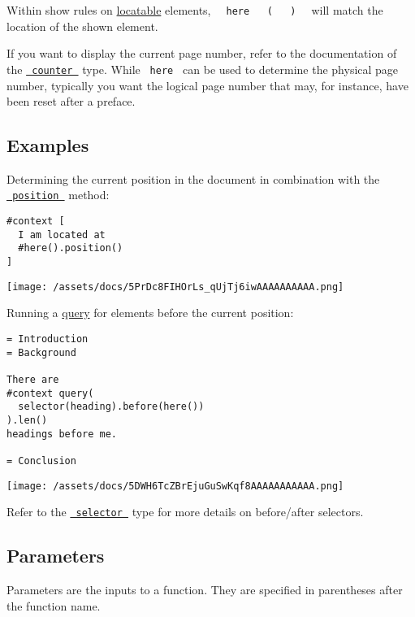 Within show rules on
\href{/docs/reference/introspection/location/\#locatable}{locatable}
elements,
\texttt{\ }{\texttt{\ here\ }}\texttt{\ }{\texttt{\ (\ }}\texttt{\ }{\texttt{\ )\ }}\texttt{\ }
will match the location of the shown element.

If you want to display the current page number, refer to the
documentation of the
\href{/docs/reference/introspection/counter/}{\texttt{\ counter\ }}
type. While \texttt{\ here\ } can be used to determine the physical page
number, typically you want the logical page number that may, for
instance, have been reset after a preface.

\subsection{Examples}\label{examples}

Determining the current position in the document in combination with the
\href{/docs/reference/introspection/location/\#definitions-position}{\texttt{\ position\ }}
method:

\begin{verbatim}
#context [
  I am located at
  #here().position()
]
\end{verbatim}

\texttt{[image: /assets/docs/5PrDc8FIHOrLs\_qUjTj6iwAAAAAAAAAA.png]}

Running a \href{/docs/reference/introspection/query/}{query} for
elements before the current position:

\begin{verbatim}
= Introduction
= Background

There are
#context query(
  selector(heading).before(here())
).len()
headings before me.

= Conclusion
\end{verbatim}

\texttt{[image: /assets/docs/5DWH6TcZBrEjuGuSwKqf8AAAAAAAAAAA.png]}

Refer to the
\href{/docs/reference/foundations/selector/}{\texttt{\ selector\ }} type
for more details on before/after selectors.

\subsection{\texorpdfstring{{ Parameters
}}{ Parameters }}\label{parameters}

\label{parameters-tooltip}
Parameters are the inputs to a function. They are specified in
parentheses after the function name.

